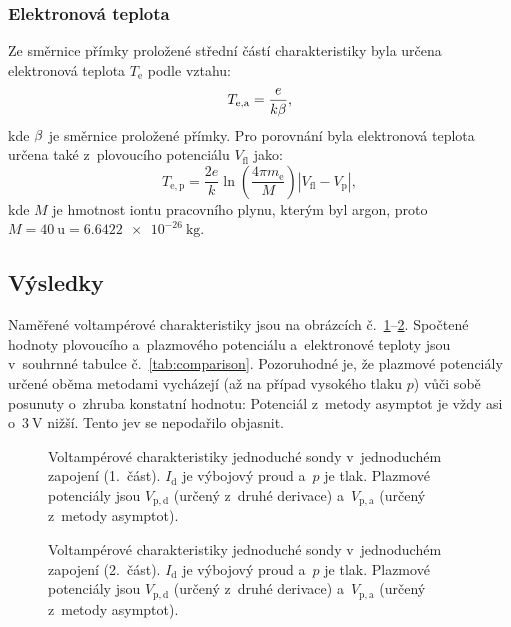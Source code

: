 \documentclass{protokol}
\newcommand\elemcharge{e}
\newcommand\boltzmann{k}
\newcommand\masselec{m_\mathrm{e}}
\newcommand\pres{p}
\newcommand\idisch{I_\mathrm{d}}
\newcommand\flpot{V_\mathrm{fl}}
\newcommand\plpot{V_\mathrm{p}}
\newcommand\plpota{V_\mathrm{p,a}}
\newcommand\plpotd{V_\mathrm{p,d}}
\newcommand\tempelec{T_\mathrm{e}}
\newcommand\tempeleca{T_\mathrm{e,a}}
\newcommand\tempelecp{T_\mathrm{e,p}}
\newcommand\massion{M}
\begin{document}
\subsubsection{Elektronová teplota}
Ze směrnice přímky proložené střední částí charakteristiky byla určena
elektronová teplota $\tempelec$ podle vztahu:
\begin{equation}
	\label{eq:tempeleca}
	\tempeleca = \frac{\elemcharge}{\boltzmann \slopeb},
\end{equation}
kde $\beta$ je směrnice proložené přímky.
%
Pro porovnání byla elektronová teplota určena také z~plovoucího potenciálu
$\flpot$ jako:
\begin{equation}
	\label{eq:tempelecp}
	\tempelecp = \frac{2\elemcharge}{\boltzmann}
		\ln\left(\frac{4\pi\masselec}{\massion}\right)
		|\flpot - \plpot|,
\end{equation}
kde $\massion$ je hmotnost iontu pracovního plynu, kterým byl argon,
proto $\massion = \SI{40}{\atomicmassunit} = \SI{6.6422e-26}{\kilogram}$.

\subsection{Výsledky}
\label{results-simple}
Naměřené voltampérové charakteristiky jsou na obrázcích
č.~\ref{fig:simple1-vac-1}--\ref{fig:simple1-vac-2}.
Spočtené hodnoty plovoucího a~plaz\-mo\-vého potenciálu a~elektronové teploty
jsou v~souhrnné tabulce č.~\ref{tab:comparison}.
Pozoruhodné je, že plazmové potenciály určené oběma metodami vycházejí
(až na případ vysokého tlaku $\pres$) vůči sobě posunuty o~zhruba konstatní
hodnotu:
Potenciál z~metody asymptot je vždy asi o~$\SI{3}{\volt}$ nižší.
Tento jev se nepodařilo objasnit.

\begin{figure}[p]
	\centering
	
	
	\par\smallskip
	
	
	\par\smallskip
	
	
	\par\smallskip
	
	
	\caption{Voltampérové charakteristiky jednoduché sondy
		v~jednoduchém zapojení (1.~část).
		$\idisch$ je výbojový proud a~$\pres$ je tlak.
		Plazmové potenciály jsou $\plpotd$ (určený z~druhé derivace)
		a~$\plpota$ (určený z~metody asymptot).}
	\label{fig:simple1-vac-1}
\end{figure}
\begin{figure}[p]
	\centering
	
	
	\par\smallskip
	
	
	\par\smallskip
	
	
	\caption{Voltampérové charakteristiky jednoduché sondy
		v~jednoduchém zapojení (2.~část).
		$\idisch$ je výbojový proud a~$\pres$ je tlak.
		Plazmové potenciály jsou $\plpotd$ (určený z~druhé derivace)
		a~$\plpota$ (určený z~metody asymptot).}
	\label{fig:simple1-vac-2}
\end{figure}
\end{document}

